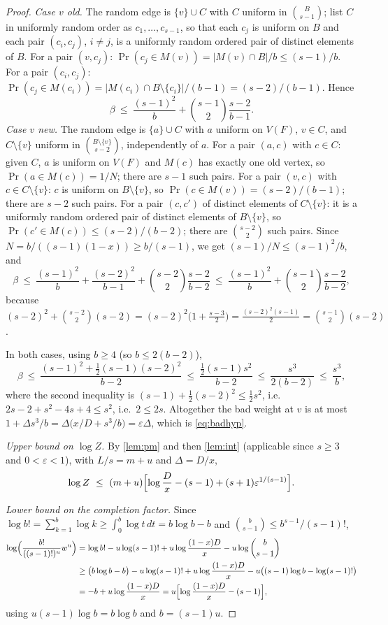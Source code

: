 \documentclass[11pt,a4paper]{article}
\theoremstyle{plain}
\theoremstyle{definition}
\theoremstyle{remark}
\begin{document}
\begin{proof}
\emph{Case $v$ old.} The random edge is $\{v\}\cup C$ with $C$ uniform in $\binom B{s-1}$; list $C$ in uniformly random order as $c_1,\dots,c_{s-1}$, so that each $c_j$ is uniform on $B$ and each pair $(c_i,c_j)$, $i\ne j$, is a uniformly random ordered pair of distinct elements of $B$. For a pair $(v,c_j)$: $\Pr(c_j\in M(v))=|M(v)\cap B|/b\le(s-1)/b$. For a pair $(c_i,c_j)$: $\Pr(c_j\in M(c_i))=|M(c_i)\cap B\setminus\{c_i\}|/(b-1)=(s-2)/(b-1)$. Hence
\[
\beta\ \le\ \frac{(s-1)^2}{b}+\binom{s-1}{2}\frac{s-2}{b-1}.
\]
\emph{Case $v$ new.} The random edge is $\{a\}\cup C$ with $a$ uniform on $V(F)$, $v\in C$, and $C\setminus\{v\}$ uniform in $\binom{B\setminus\{v\}}{s-2}$, independently of $a$. For a pair $(a,c)$ with $c\in C$: given $C$, $a$ is uniform on $V(F)$ and $M(c)$ has exactly one old vertex, so $\Pr(a\in M(c))=1/N$; there are $s-1$ such pairs. For a pair $(v,c)$ with $c\in C\setminus\{v\}$: $c$ is uniform on $B\setminus\{v\}$, so $\Pr(c\in M(v))=(s-2)/(b-1)$; there are $s-2$ such pairs. For a pair $(c,c')$ of distinct elements of $C\setminus\{v\}$: it is a uniformly random ordered pair of distinct elements of $B\setminus\{v\}$, so $\Pr(c'\in M(c))\le(s-2)/(b-2)$; there are $\binom{s-2}2$ such pairs. Since $N=b/((s-1)(1-x))\ge b/(s-1)$, we get $(s-1)/N\le(s-1)^2/b$, and
\[
\beta\ \le\ \frac{(s-1)^2}{b}+\frac{(s-2)^2}{b-1}+\binom{s-2}{2}\frac{s-2}{b-2}\ \le\ \frac{(s-1)^2}{b}+\binom{s-1}{2}\frac{s-2}{b-2},
\]
because $(s-2)^2+\binom{s-2}2(s-2)=(s-2)^2\bigl(1+\tfrac{s-3}{2}\bigr)=\tfrac{(s-2)^2(s-1)}2=\binom{s-1}2(s-2)$.

In both cases, using $b\ge4$ (so $b\le2(b-2)$),
\[
\beta\ \le\ \frac{(s-1)^2+\tfrac12(s-1)(s-2)^2}{b-2}\ \le\ \frac{\tfrac12(s-1)s^2}{b-2}\ \le\ \frac{s^3}{2(b-2)}\ \le\ \frac{s^3}{b},
\]
where the second inequality is $(s-1)+\tfrac12(s-2)^2\le\tfrac12s^2$, i.e.\ $2s-2+s^2-4s+4\le s^2$, i.e.\ $2\le2s$. Altogether the bad weight at $v$ is at most $1+\Delta s^3/b=\Delta\bigl(x/D+s^3/b\bigr)=\varepsilon\Delta$, which is \eqref{eq:badhyp}.

\emph{Upper bound on $\log Z$.} By \cref{lem:pm} and then \cref{lem:int} (applicable since $s\ge3$ and $0<\varepsilon<1$), with $L/s=m+u$ and $\Delta=D/x$,
\begin{equation}\label{eq:Zup}
\log Z\ \le\ (m+u)\Bigl[\log\frac Dx-(s-1)+(s+1)\varepsilon^{1/(s-1)}\Bigr].
\end{equation}

\emph{Lower bound on the completion factor.} Since $\log b!=\sum_{k=1}^b\log k\ge\int_0^b\log t\,dt=b\log b-b$ and $\binom b{s-1}\le b^{s-1}/(s-1)!$,
\begin{align*}
\log\Bigl(\frac{b!}{((s-1)!)^u}w^u\Bigr)
&=\log b!-u\log(s-1)!+u\log\frac{(1-x)D}{x}-u\log\binom b{s-1}\\
&\ge\bigl(b\log b-b\bigr)-u\log(s-1)!+u\log\frac{(1-x)D}{x}-u\bigl((s-1)\log b-\log(s-1)!\bigr)\\
&=-b+u\log\frac{(1-x)D}{x}
= u\Bigl[\log\frac{(1-x)D}{x}-(s-1)\Bigr],
\end{align*}
using $u(s-1)\log b=b\log b$ and $b=(s-1)u$.


\end{proof}
\end{document}
